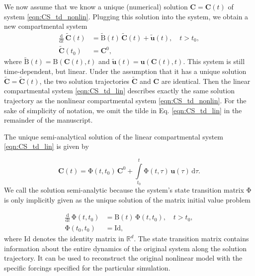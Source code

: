 \documentclass[draft]{agujournal2019}
\renewcommand{\vec}[1]{\mathbf{#1}}
\newcommand{\tens}[1]{\mathrm{#1}}
\newcommand{\id}{\tens{Id}}
\newcommand{\deriv}[1]{\frac{\mathrm{d}}{\mathrm{d}#1}}
\newcommand{\dd}[1]{\,\mathrm{d}#1}
\newcommand{\intl}{\int\limits}
\newcommand{\R}{\mathbb{R}}
\begin{document}
    We now assume that we know a unique (numerical) solution $\vec{C}=\vec{C}(t)$ of system \eqref{eqn:CS_td_nonlin}.
    Plugging this solution into the system, we obtain a new compartmental system
    \begin{equation}\label{eqn:CS_td_lin}
        \begin{aligned}
            \deriv{t}\,\widetilde{\vec{C}}(t) &= \widetilde{\tens{B}}(t)\,\widetilde{\vec{C}}(t) + \widetilde{\vec{u}}(t),\quad t>t_0,\\
            \widetilde{\vec{C}}(t_0) &= \vec{C}^0,
        \end{aligned}
    \end{equation}
    where $\widetilde{\tens{B}}(t)=\tens{B}(\vec{C}(t),t)$ and $\widetilde{\vec{u}}(t)=\vec{u}(\vec{C}(t),t)$.
    This system is still time-dependent, but linear.
    Under the assumption that it has a unique solution $\widetilde{\vec{C}}=\widetilde{\vec{C}}(t)$, the two solution trajectories $\widetilde{\vec{C}}$ and $\vec{C}$ are identical.
    Then the linear compartmental system \eqref{eqn:CS_td_lin} describes exactly the same solution trajectory as the nonlinear compartmental system \eqref{eqn:CS_td_nonlin}.
    For the sake of simplicity of notation, we omit the tilde in Eq. \eqref{eqn:CS_td_lin} in the remainder of the manuscript.
    
    The unique semi-analytical solution of the linear compartmental system \eqref{eqn:CS_td_lin} is given by \cite{Brockett2015}
    
    \begin{equation*}
        \vec{C}(t) = \tens{\Phi}(t,t_0)\,\vec{C}^0 + \intl_{t_0}^t \tens{\Phi}(t,\tau)\,\vec{u}(\tau)\dd{\tau}.
    \end{equation*}
    We call the solution semi-analytic because the system's state transition matrix $\tens{\Phi}$ is only implicitly given as the unique solution of the matrix initial value problem
    
    \begin{equation*}
        \begin{aligned}
            \deriv{t}\,\tens{\Phi}(t,t_0) &= \tens{B}(t)\,\tens{\Phi}(t,t_0),\quad t>t_0,\\
            \tens{\Phi}(t_0,t_0) &= \id,
        \end{aligned}
    \end{equation*}
    where $\id$ denotes the identity matrix in $\R^d$. The state transition matrix contains information about the entire dynamics of the original system along the solution trajectory. It can be used to reconstruct the original nonlinear model with the specific forcings specified for the particular simulation. 
   
\end{document}
